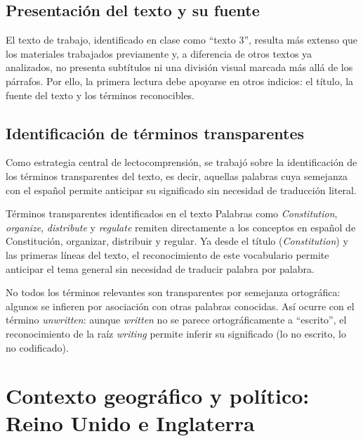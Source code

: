 \documentclass[12pt,oneside]{book}
\begin{document}
\section{Presentación del texto y su fuente}

El texto de trabajo, identificado en clase como ``texto 3'', resulta más extenso que los materiales trabajados previamente y, a diferencia de otros textos ya analizados, no presenta subtítulos ni una división visual marcada más allá de los párrafos. Por ello, la primera lectura debe apoyarse en otros indicios: el título, la fuente del texto y los términos reconocibles.

\section{Identificación de términos transparentes}

Como estrategia central de lectocomprensión, se trabajó sobre la identificación de los términos transparentes del texto, es decir, aquellas palabras cuya semejanza con el español permite anticipar su significado sin necesidad de traducción literal.

\begin{example}{Términos transparentes identificados en el texto}
Palabras como \emph{Constitution}, \emph{organize}, \emph{distribute} y \emph{regulate} remiten directamente a los conceptos en español de Constitución, organizar, distribuir y regular. Ya desde el título (\emph{Constitution}) y las primeras líneas del texto, el reconocimiento de este vocabulario permite anticipar el tema general sin necesidad de traducir palabra por palabra.
\end{example}

\begin{note}
No todos los términos relevantes son transparentes por semejanza ortográfica: algunos se infieren por asociación con otras palabras conocidas. Así ocurre con el término \emph{unwritten}: aunque \emph{written} no se parece ortográficamente a ``escrito'', el reconocimiento de la raíz \emph{writing} permite inferir su significado (lo no escrito, lo no codificado).
\end{note}

\chapter{Contexto geográfico y político: Reino Unido e Inglaterra}
\end{document}
